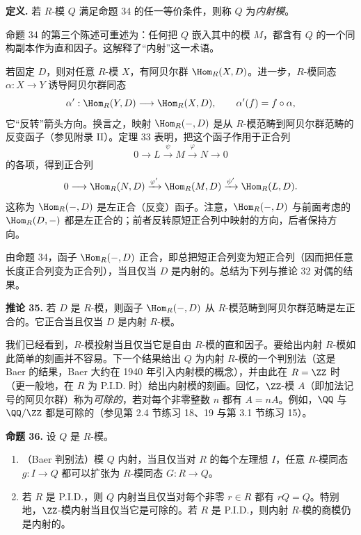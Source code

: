 \noindent\textbf{定义.} 若 $R$-模 $Q$ 满足命题 34 的任一等价条件，则称 $Q$ 为\emph{内射模}。

命题 34 的第三个陈述可重述为：任何把 $Q$ 嵌入其中的模 $M$，都含有 $Q$ 的一个同构副本作为直和因子。这解释了“内射”这一术语。

若固定 $D$，则对任意 $R$-模 $X$，有阿贝尔群 $\Hom_R(X,D)$。进一步，$R$-模同态 $\alpha:X\to Y$ 诱导阿贝尔群同态
\[
\alpha':\Hom_R(Y,D)\longrightarrow\Hom_R(X,D),
\qquad \alpha'(f)=f\circ\alpha,
\]
它“反转”箭头方向。换言之，映射 $\Hom_R(-,D)$ 是从 $R$-模范畴到阿贝尔群范畴的反变函子（参见附录 II）。定理 33 表明，把这个函子作用于正合列
\[
0\longrightarrow L\xrightarrow{\psi}M\xrightarrow{\varphi}N\longrightarrow0
\]
的各项，得到正合列
\[
0\longrightarrow\Hom_R(N,D)\xrightarrow{\varphi'}\Hom_R(M,D)\xrightarrow{\psi'}\Hom_R(L,D).
\]
这称为 $\Hom_R(-,D)$ 是左正合（反变）函子。注意，$\Hom_R(-,D)$ 与前面考虑的 $\Hom_R(D,-)$ 都是左正合的；前者反转原短正合列中映射的方向，后者保持方向。

由命题 34，函子 $\Hom_R(-,D)$ 正合，即总把短正合列变为短正合列（因而把任意长度正合列变为正合列），当且仅当 $D$ 是内射的。总结为下列与推论 32 对偶的结果。

\noindent\textbf{推论 35.} 若 $D$ 是 $R$-模，则函子 $\Hom_R(-,D)$ 从 $R$-模范畴到阿贝尔群范畴是左正合的。它正合当且仅当 $D$ 是内射 $R$-模。

我们已经看到，$R$-模投射当且仅当它是自由 $R$-模的直和因子。要给出内射 $R$-模如此简单的刻画并不容易。下一个结果给出 $Q$ 为内射 $R$-模的一个判别法（这是 Baer 的结果，Baer 大约在 1940 年引入内射模的概念），并由此在 $R=\ZZ$ 时（更一般地，在 $R$ 为 P.I.D. 时）给出内射模的刻画。回忆，$\ZZ$-模 $A$（即加法记号的阿贝尔群）称为\emph{可除的}，若对每个非零整数 $n$ 都有 $A=nA$。例如，$\QQ$ 与 $\QQ/\ZZ$ 都是可除的（参见第 2.4 节练习 18、19 与第 3.1 节练习 15）。

\noindent\textbf{命题 36.} 设 $Q$ 是 $R$-模。
\begin{enumerate}[label=(\arabic*)]
\item （Baer 判别法）模 $Q$ 内射，当且仅当对 $R$ 的每个左理想 $I$，任意 $R$-模同态 $g:I\to Q$ 都可以扩张为 $R$-模同态 $G:R\to Q$。
\item 若 $R$ 是 P.I.D.，则 $Q$ 内射当且仅当对每个非零 $r\in R$ 都有 $rQ=Q$。特别地，$\ZZ$-模内射当且仅当它是可除的。若 $R$ 是 P.I.D.，则内射 $R$-模的商模仍是内射的。
\end{enumerate}

